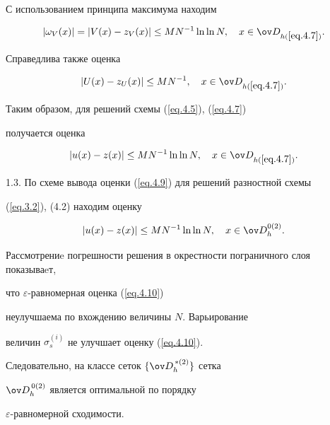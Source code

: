 С использованием принципа максимума находим


$$


|\omega_V(x)|=|V(x)-z_V(x)|\le M N^{-1}\ln\ln N, \quad


x\in \ov D_{h(\ref{eq.4.7})}.


$$





Справедлива также оценка


$$


|U(x)-z_U(x)|\le M N^{-1}, \quad x\in \ov D_{h(\ref{eq.4.7})}.


$$


Таким образом, для решений схемы (\ref{eq.4.5}), (\ref{eq.4.7})


получается оценка


\begin{equation} \label{eq.4.9}


|u(x)-z(x)|\le M N^{-1}\ln\ln N, \quad x\in \ov D_{h(\ref{eq.4.7})}.


\end{equation}





1.3. По схеме вывода оценки (\ref{eq.4.9}) для решений разностной схемы


(\ref{eq.3.2}), (4.2) находим оценку


\begin{equation} \label{eq.4.10}


|u(x)-z(x)|\le M N^{-1}\ln\ln N, \quad x\in \ov D_h^{0(2)}.


\end{equation}





Рассмотрениe погрешности решения в окрестности пограничного слоя показываeт,


что $\varepsilon$-равномерная оценка (\ref{eq.4.10})


неулучшаема по вхождению величины $N$. Варьирование 


величин $\sigma_s^{(i)}$ не улучшает оценку (\ref{eq.4.10}).


Следовательно, на классе сеток $\{\ov D_h^{\,*(2)}\}$ сетка


$\ov D_h^{\,0(2)}$ является оптимальной по порядку


$\varepsilon$-равномерной сходимости.





